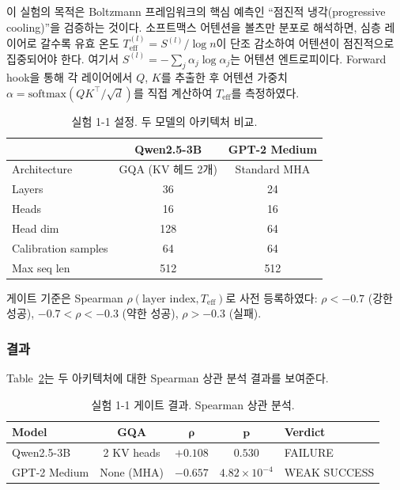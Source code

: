 \documentclass[11pt,a4paper]{article}
\begin{document}
이 실험의 목적은 Boltzmann 프레임워크의 핵심 예측인 ``점진적 냉각(progressive cooling)''을 검증하는 것이다.
소프트맥스 어텐션을 볼츠만 분포로 해석하면, 심층 레이어로 갈수록 유효 온도 $T_\mathrm{eff}^{(l)} = S^{(l)} / \log n$이 단조 감소하여 어텐션이 점진적으로 집중되어야 한다.
여기서 $S^{(l)} = -\sum_j \alpha_j \log \alpha_j$는 어텐션 엔트로피이다.
Forward hook을 통해 각 레이어에서 $Q$, $K$를 추출한 후 어텐션 가중치 $\alpha = \mathrm{softmax}(QK^\top / \sqrt{d})$를 직접 계산하여 $T_\mathrm{eff}$를 측정하였다.

\begin{table}[H]
\centering
\caption{실험 1-1 설정. 두 모델의 아키텍처 비교.}
\label{tab:exp11_setup}
\begin{tabular}{lcc}
\toprule
\textbf{} & \textbf{Qwen2.5-3B} & \textbf{GPT-2 Medium} \\
\midrule
Architecture & GQA (KV 헤드 2개) & Standard MHA \\
Layers & 36 & 24 \\
Heads & 16 & 16 \\
Head dim & 128 & 64 \\
Calibration samples & 64 & 64 \\
Max seq len & 512 & 512 \\
\bottomrule
\end{tabular}
\end{table}

게이트 기준은 Spearman $\rho(\text{layer index}, T_\mathrm{eff})$로 사전 등록하였다: $\rho < -0.7$ (강한 성공), $-0.7 < \rho < -0.3$ (약한 성공), $\rho > -0.3$ (실패).

\subsubsection{결과}

Table~\ref{tab:gate}는 두 아키텍처에 대한 Spearman 상관 분석 결과를 보여준다.

\begin{table}[H]
\centering
\caption{실험 1-1 게이트 결과. Spearman 상관 분석.}
\label{tab:gate}
\begin{tabular}{lcccl}
\toprule
\textbf{Model} & \textbf{GQA} & $\boldsymbol{\rho}$ & $\boldsymbol{p}$ & \textbf{Verdict} \\
\midrule
Qwen2.5-3B & 2 KV heads & $+0.108$ & $0.530$ & \textcolor{failure}{FAILURE} \\
GPT-2 Medium & None (MHA) & $-0.657$ & $4.82 \times 10^{-4}$ & \textcolor{partial}{WEAK SUCCESS} \\
\bottomrule
\end{tabular}
\end{table}
\end{document}
